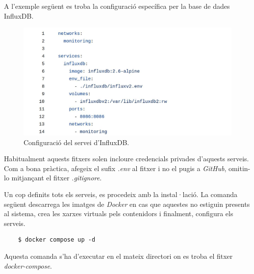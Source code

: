 \clearpage

\noindent
A l'exemple següent es troba la configuració específica per la base de dades InfluxDB.

\begin{figure}[htbp]
    \centerline{\includegraphics[width=\textwidth]{figures/docker-compose-influxdb}}
    \captionsetup{justification=centering}
    \caption{Configuració del servei d'InfluxDB.}\label{fig:docker-compose-influxdb}
\end{figure}

\begin{tcolorbox}[colback=blue!5!white, colframe=blue!75!black, title=Fitxers de configuració]
    Habitualment aquests fitxers solen incloure credencials privades d'aquests serveis.
    Com a bona pràctica, afegeix el sufix \textit{.env} al fitxer i no el pugis a \textit{\gls{GitHub}}, omitin-lo mitjançant el fitxer \textit{.\gls{gitignore}}.
\end{tcolorbox}
\vspace{1em}

\noindent
Un cop definits tots els serveis, es procedeix amb la instal·lació.
La comanda següent descarrega les imatges de \textit{\gls{Docker}} en cas que aquestes no estiguin presents al sistema,
crea les xarxes virtuals pels contenidors i finalment, configura els serveis.

\begin{verbatim}
    $ docker compose up -d
\end{verbatim}

\begin{tcolorbox}[colback=red!5!white, colframe=red!75!black, title=Atenció]
    Aquesta comanda s'ha d'executar en el mateix directori on es troba el fitxer \textit{\gls{docker-compose}}.
\end{tcolorbox}

